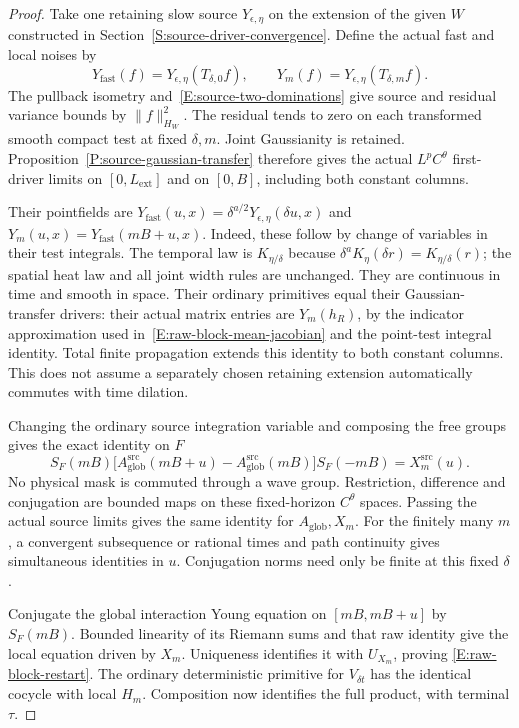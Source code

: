 \begin{proof}
  Take one retaining slow source $Y_{\epsilon,\eta}$ on the
  extension of the given $W$ constructed in
  Section~\ref{S:source-driver-convergence}. Define the actual
  fast and local noises by
  \[
    Y_{\mathrm{fast}}(f)=Y_{\epsilon,\eta}(T_{\delta,0}f),\qquad
    Y_m(f)=Y_{\epsilon,\eta}(T_{\delta,m}f).
  \]
  The pullback isometry and~\eqref{E:source-two-dominations} give
  source and residual variance bounds by $\|f\|_{H_W}^2$.
  The residual tends to zero on each transformed smooth compact test
  at fixed $\delta,m$. Joint Gaussianity is retained.
  Proposition~\ref{P:source-gaussian-transfer} therefore gives the
  actual $L^pC^\theta$ first-driver limits on $[0,L_{\mathrm{ext}}]$
  and on $[0,B]$, including both constant columns.

  Their pointfields are
  $Y_{\mathrm{fast}}(u,x)=\delta^{a/2}Y_{\epsilon,\eta}(\delta u,x)$
  and $Y_m(u,x)=Y_{\mathrm{fast}}(mB+u,x)$.
  Indeed, these follow by change of variables in their test integrals.
  The temporal law is $K_{\eta/\delta}$ because
  $\delta^aK_\eta(\delta r)=K_{\eta/\delta}(r)$;
  the spatial heat law and all joint width rules are unchanged.
  They are continuous in time and smooth in space.
  Their ordinary primitives equal their Gaussian-transfer drivers:
  their actual matrix entries are $Y_m(h_R)$, by the indicator
  approximation used in~\eqref{E:raw-block-mean-jacobian} and the
  point-test integral identity. Total finite propagation extends
  this identity to both constant columns.
  This does not assume a separately chosen retaining extension
  automatically commutes with time dilation.

  Changing the ordinary source integration variable and composing
  the free groups gives the exact identity on $F$
  \[
    S_F(mB)\big[A_{\mathrm{glob}}^{\mathrm{src}}(mB+u)
    -A_{\mathrm{glob}}^{\mathrm{src}}(mB)\big]
    S_F(-mB)=X_m^{\mathrm{src}}(u).
  \]
  No physical mask is commuted through a wave group.
  Restriction, difference and conjugation are bounded maps on
  these fixed-horizon $C^\theta$ spaces. Passing the actual source
  limits gives the same identity for $A_{\mathrm{glob}},X_m$.
  For the finitely many $m$, a convergent subsequence or rational
  times and path continuity gives simultaneous identities in $u$.
  Conjugation norms need only be finite at this fixed $\delta$.

  Conjugate the global interaction Young equation on
  $[mB,mB+u]$ by $S_F(mB)$. Bounded linearity of its Riemann sums
  and that raw identity give the local equation driven by $X_m$.
  Uniqueness identifies it with $U_{X_m}$, proving
  \eqref{E:raw-block-restart}. The ordinary deterministic primitive
  for $V_{\delta t}$ has the identical cocycle with local $H_m$.
  Composition now identifies the full product, with terminal $\tau$.


\end{proof}

